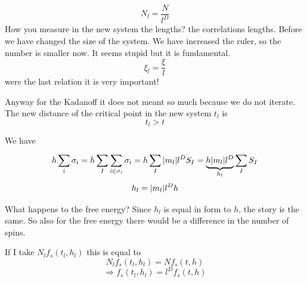 \documentclass[../main/main.tex]{subfiles}
\begin{document}
\begin{equation}
  N_l = \frac{N}{l^D}
\end{equation}
How you measure in the new system the lengths? the correlations lengths. Before we have changed the size of the system. We have increased the ruler, so the number is smaller now. It seems stupid but it is fundamental.
\begin{equation}
  \xi _l = \frac{\xi }{l}
\end{equation}
were the last relation it is very important!

Anyway for the Kadanoff it does not meant so much because we do not iterate.
The new distance of the critical point in the new system \( t_l \) is
\begin{equation}
  t_l > t
\end{equation}

We have
\begin{equation}
  h \sum_{i}^{} \sigma _i = h \sum_{I}^{} \sum_{i \in \sigma _i}^{}  \sigma _i = h \sum_{I}^{}    \abs{m_l} l^D S_I
  = \underbrace{h \abs{m_l} l^D}_{h_l} \sum_{I}^{} S_I
\end{equation}
\begin{equation}
  h_l = \abs{m_l} l^D h
\end{equation}

What happens to the free energy?
Since \( h_l \) is equal in form to \( h \), the story is the same. So also for the free energy there would be a difference in the number of spins.

If I take \(   N_l f_s (t_l,h_l) \) this is equal to
\begin{equation}
  N_l f_s (t_l,h_l) = N f_s (t,h)
\end{equation}
\begin{equation}
  \Rightarrow  f_s (t_l,h_l) = l^D f_s (t,h)
\end{equation}
\end{document}
